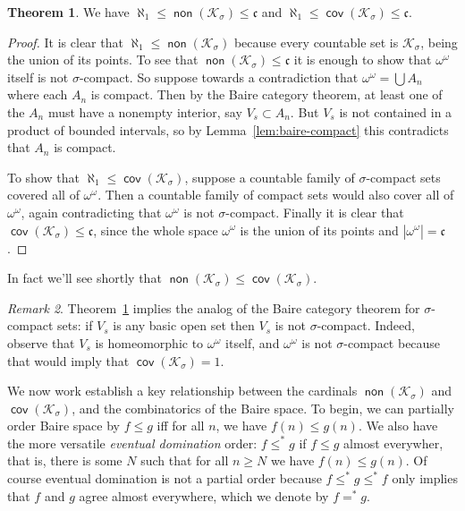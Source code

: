 \documentclass[11pt,oneside]{amsart}
\DeclareMathOperator{\non}{\mathsf{non}}
\DeclareMathOperator{\cov}{\mathsf{cov}}
\theoremstyle{definition}
\newtheorem{thm}{Theorem}[section]
\theoremstyle{definition}
\theoremstyle{remark}
\newtheorem{rem}[thm]{Remark}
\begin{document}
\begin{thm}
  \label{thm:k-sigma}
  We have $\aleph_1\leq\non(\mathcal K_\sigma)\leq\mathfrak c$ and $\aleph_1\leq\cov(\mathcal K_\sigma)\leq\mathfrak c$.
\end{thm}

\begin{proof}
  It is clear that $\aleph_1\leq\non(\mathcal K_\sigma)$ because every countable set is $\mathcal K_\sigma$, being the union of its points. To see that $\non(\mathcal K_\sigma)\leq\mathfrak c$ it is enough to show that $\omega^\omega$ itself is not $\sigma$-compact. So suppose towards a contradiction that $\omega^\omega=\bigcup A_n$ where each $A_n$ is compact. Then by the Baire category theorem, at least one of the $A_n$ must have a nonempty interior, say $V_s\subset A_n$. But $V_s$ is not contained in a product of bounded intervals, so by Lemma~\ref{lem:baire-compact} this contradicts that $A_n$ is compact.

  To show that $\aleph_1\leq\cov(\mathcal K_\sigma)$, suppose a countable family of $\sigma$-compact sets covered all of $\omega^\omega$. Then a countable family of compact sets would also cover all of $\omega^\omega$, again contradicting that $\omega^\omega$ is not $\sigma$-compact. Finally it is clear that $\cov(\mathcal K_\sigma)\leq\mathfrak c$, since the whole space $\omega^\omega$ is the union of its points and $|\omega^\omega|=\mathfrak c$.
\end{proof}

In fact we'll see shortly that $\non(\mathcal K_\sigma)\leq\cov(\mathcal K_\sigma)$.

\begin{rem}
  Theorem~\ref{thm:k-sigma} implies the analog of the Baire category theorem for $\sigma$-compact sets: if $V_s$ is any basic open set then $V_s$ is not $\sigma$-compact. Indeed, observe that $V_s$ is homeomorphic to $\omega^\omega$ itself, and $\omega^\omega$ is not $\sigma$-compact because that would imply that $\cov(\mathcal K_\sigma)=1$.
\end{rem}

We now work establish a key relationship between the cardinals $\non(\mathcal K_\sigma)$ and $\cov(\mathcal K_\sigma)$, and the combinatorics of the Baire space. To begin, we can partially order Baire space by $f\leq g$ iff for all $n$, we have $f(n)\leq g(n)$. We also have the more versatile \emph{eventual domination} order: $f\leq^*g$ if $f\leq g$ almost everywher, that is, there is some $N$ such that for all $n\geq N$ we have $f(n)\leq g(n)$. Of course eventual domination is not a partial order because $f\leq^*g\leq^*f$ only implies that $f$ and $g$ agree almost everywhere, which we denote by $f=^*g$.
\end{document}

